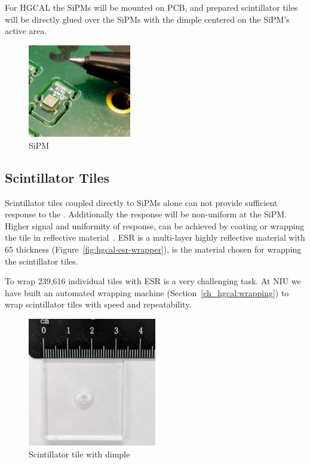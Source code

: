 For \gls{HGCAL} the \glspl{SiPM} will be mounted on \gls{PCB},
and prepared scintillator tiles will be directly glued
over the \glspl{SiPM} with the dimple centered on the \gls{SiPM}'s active area.

\begin{figure}[!ht]
  \centering
  \includegraphics[width=0.4\textwidth]{figures/hgcal/sipm.jpg}
  \caption[SiPM]{SiPM}%
  \label{fig:hgcal-sipm}
\end{figure}

\subsection{
  Scintillator Tiles
}\label{ch_hgcal:scint-tiles}

Scintillator tiles coupled directly to \glspl{SiPM} alone can not provide
sufficient response to the .
Additionally
the response will be non-uniform at the \gls{SiPM}. Higher
signal and uniformity of response, can be achieved by coating or wrapping the tile in  reflective
material~\cite{niu-sipm-on-tile}. \gls{ESR}
is a multi-layer highly reflective material with 65\micron{} thickness (Figure~\ref{fig:hgcal-esr-wrapper}), is the material chosen for wrapping the scintillator tiles.

To wrap 239,616 individual tiles  with \gls{ESR} is a very challenging task.
At NIU we have built an automated wrapping machine (Section~\ref{ch_hgcal:wrapping}) to
wrap scintillator tiles with speed and repeatability.

\begin{figure}[!ht]
  \centering
  \includegraphics[width=0.5\textwidth]{figures/hgcal/tile_19.jpg}
  \caption[Scintillator tile with dimple]{Scintillator tile with dimple}%
  \label{fig:hgcal-scintillator-tile}
\end{figure}

